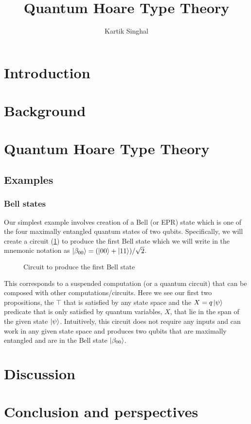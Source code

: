 \documentclass[adraft,creativecommons]{eptcs}
\title{Quantum Hoare Type Theory}
\author{
Kartik Singhal
\institute{University of Chicago}
\email{\mailtodomain{ks@cs.uchicago.edu}}
}
\begin{document}
\maketitle

\section{Introduction}

\section{Background}

\section{Quantum Hoare Type Theory}

\subsection{Examples}

\subsubsection{Bell states}

Our simplest example involves creation of a Bell (or EPR) state which is one of the four maximally entangled quantum states of two qubits. Specifically, we will create a circuit (\cref{fig:bell00}) to produce the first Bell state which we will write in the mnemonic notation as $\ket{\beta_{00}} = (\ket{00}+\ket{11})/\sqrt{2}$.

\begin{figure}
    \centering
    \caption{Circuit to produce the first Bell state}
    \label{fig:bell00}
\end{figure}



This corresponds to a suspended computation (or a quantum circuit) that can be composed with other computations/circuits. Here we see our first two propositions, the $\top$ that is satisfied by any state space and the $X =q \ket{\psi}$ predicate that is only satisfied by quantum variables, $X$, that lie in the span of the given state $\ket{\psi}$. Intuitively, this circuit does not require any inputs and can work in any given state space and produces two qubits that are maximally entangled and are in the Bell state $\ket{\beta_{00}}$.

\section{Discussion}

\section{Conclusion and perspectives}


\end{document}

